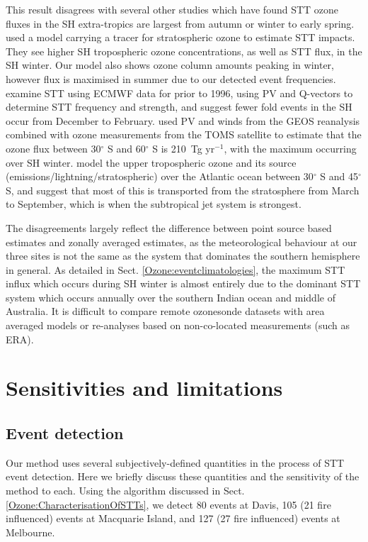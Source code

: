    This result disagrees with several other studies which have found STT ozone fluxes in the SH extra-tropics are largest from autumn or winter to early spring.
    \cite{Roelofs1997} used a model carrying a tracer for stratospheric ozone to estimate STT impacts. 
    They see higher SH tropospheric ozone concentrations, as well as STT flux, in the SH winter.
    Our model also shows ozone column amounts peaking in winter, however flux is maximised in summer due to our detected event frequencies.
    \cite{Elbern1998} examine STT using ECMWF data for prior to 1996, using PV and Q-vectors to determine STT frequency and strength, and suggest fewer fold events in the SH occur from December to February.
    \citet{Olsen2003} used PV and winds from the GEOS reanalysis combined with ozone measurements from the TOMS satellite to estimate that the ozone flux between 30$^{\circ}$ S and 60$^{\circ}$ S is 210~Tg yr$^{-1}$, with the maximum occurring over SH winter.
    \citet{Liu2017} model the upper tropospheric ozone and its source (emissions/lightning/stratospheric) over the Atlantic ocean between 30$^{\circ}$ S and 45$^{\circ}$ S, and suggest that most of this is transported from the stratosphere from March to September, which is when the subtropical jet system is strongest.
    
    The disagreements largely reflect the difference between point source based estimates and zonally averaged estimates, as the meteorological behaviour at our three sites is not the same as the system that dominates the southern hemisphere in general.
    As detailed in Sect. \ref{Ozone:eventclimatologies}, the maximum STT influx which occurs during SH winter is almost entirely due to the dominant STT system which occurs annually over the southern Indian ocean and middle of Australia.
    It is difficult to compare remote ozonesonde datasets with area averaged models or re-analyses based on non-co-located measurements (such as ERA).

\section{Sensitivities and limitations}
  \label{Ozone:sensitivity}
  \subsection{Event detection}
    Our method uses several subjectively-defined quantities in the process of STT event detection.
    Here we briefly discuss these quantities and the sensitivity of the method to each.
    Using the algorithm discussed in Sect. \ref{Ozone:CharacterisationOfSTTs}, we detect 80 events at Davis, 105 (21 fire influenced) events at Macquarie Island, and 127 (27 fire influenced) events at Melbourne.
    
